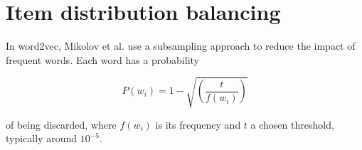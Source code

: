 \documentclass[a4paper,oneside,12pt]{article}
\begin{document}
\section{Item distribution balancing}

In word2vec, Mikolov et al. \cite{Mikolov2013DistributedRO} use a subsampling approach to reduce the impact of frequent words.
Each word has a probability

\begin{equation}
P(w_i) = 1 - \sqrt{ \left( \frac{t}{f(w_i)} \right) }
\end{equation}

of being discarded, where $f(w_i)$ is its frequency and $t$ a chosen threshold, typically around $10^{-5}$.


\printbibliography
\end{document}

